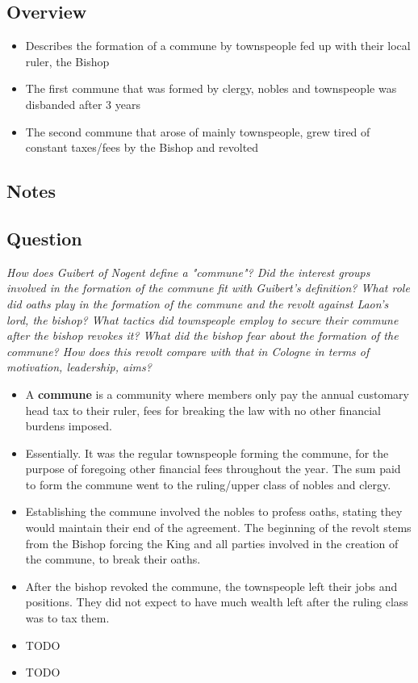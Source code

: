 \documentclass[12pt]{article}
\begin{document}
\subsection*{Overview}
\begin{itemize}
	\item Describes the formation of a commune by townspeople fed up with their local ruler, the Bishop
	\item The first commune that was formed by clergy, nobles and townspeople was disbanded after 3 years
	\item The second commune that arose of mainly townspeople, grew tired of constant taxes/fees by the Bishop and revolted
\end{itemize}

\subsection*{Notes}

\subsection*{Question}

\textit{How does Guibert of Nogent define a "commune"? Did the interest groups involved in the formation of the commune fit with Guibert's definition? What role did oaths play in the formation of the commune and the revolt against Laon's lord, the bishop? What tactics did townspeople employ to secure their commune after the bishop revokes it? What did the bishop fear about the formation of the commune? How does this revolt compare with that in Cologne in terms of motivation, leadership, aims?}

\begin{itemize}
	\item A \textbf{commune} is a community where members only pay the annual customary head tax to their ruler, fees for breaking the law with no other financial burdens imposed.
	\item Essentially. It was the regular townspeople forming the commune, for the purpose of foregoing other financial fees throughout the year. The sum paid to form the commune went to the ruling/upper class of nobles and clergy.
	\item Establishing the commune involved the nobles to profess oaths, stating they would maintain their end of the agreement. The beginning of the revolt stems from the Bishop forcing the King and all parties involved in the creation of the commune, to break their oaths.
	\item After the bishop revoked the commune, the townspeople left their jobs and positions. They did not expect to have much wealth left after the ruling class was to tax them.
	\item TODO
	\item TODO
\end{itemize}
\end{document}
